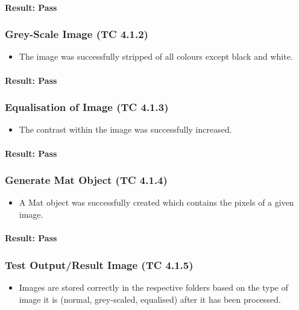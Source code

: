 \documentclass[a4paper,12pt]{report}
\begin{document}
		\paragraph{Result: Pass}
		
		\subsubsection{Grey-Scale Image (TC 4.1.2)}
		\begin {itemize}
			\item The image was successfully stripped of all colours except black and white.
		\end {itemize}
		\paragraph{Result: Pass}
		
		\subsubsection{Equalisation of Image (TC 4.1.3)}
		\begin {itemize}
			\item The contrast within the image was successfully increased.
		\end {itemize}	
		\paragraph{Result: Pass}
		
		\subsubsection{Generate Mat Object (TC 4.1.4)}
		\begin {itemize}
			\item A Mat object was successfully created which contains the pixels of a given image.
		\end {itemize}
		\paragraph{Result: Pass}
		
		\subsubsection{Test Output/Result Image (TC 4.1.5)}
		\begin {itemize}
		\item Images are stored correctly in the respective folders based on the type of image it is (normal, grey-scaled, equalised) after it has been processed.
		\end {itemize}
\end{document}
